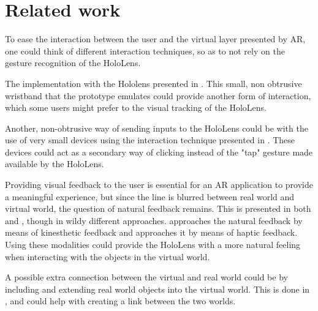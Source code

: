 
\section{Related work}
To ease the interaction between the user and the virtual layer presented by AR, one could think of different interaction techniques, so as to not rely on the gesture recognition of the HoloLens.\par
The implementation with the Hololens presented in \cite{watchsense}. This small, non obtrusive wristband that the prototype emulates could provide another form of interaction, which some users might prefer to the visual tracking of the HoloLens.\par
Another, non-obtrusive way of sending inputs to the HoloLens could be with the use of very small devices using the interaction technique presented in \cite{back}. These devices could act as a secondary way of clicking instead of the "tap" gesture made available by the HoloLens.\par
Providing visual feedback to the user is essential for an AR application to  provide a meaningful experience, but since the line is blurred between real world and virtual world, the question of natural feedback remains. This is presented in both \cite{stroem} and \cite{finger}, though in wildy different approaches. \cite{stroem} approaches the natural feedback by means of kinesthetic feedback and \cite{finger} approaches it by means of haptic feedback. Using these modalities could provide the HoloLens with a more natural feeling when interacting with the objects in the virtual world.\par
A possible extra connection between the virtual and real world could be by including and extending real world objects into the virtual world. This is done in \cite{multifi}, and could help with creating a link between the two worlds. 